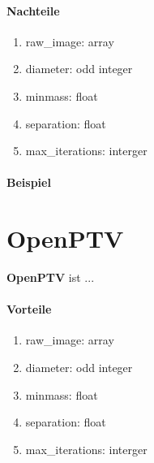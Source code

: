 	\paragraph{Nachteile}
		\begin{enumerate}
    			\item raw\_image: array \\

    			\item diameter: odd integer \\

    			\item minmass: float \\
    			
    			\item separation: float\\
 			
    			\item max\_iterations: interger\\
    			
		\end{enumerate}
		
	\paragraph{Beispiel}

\section{OpenPTV}
\textbf{OpenPTV} ist ... 

	\paragraph{Vorteile}
		\begin{enumerate}
    			\item raw\_image: array \\

    			\item diameter: odd integer \\

    			\item minmass: float \\
    			
    			\item separation: float\\
 			
    			\item max\_iterations: interger\\
    			
		\end{enumerate}
		
